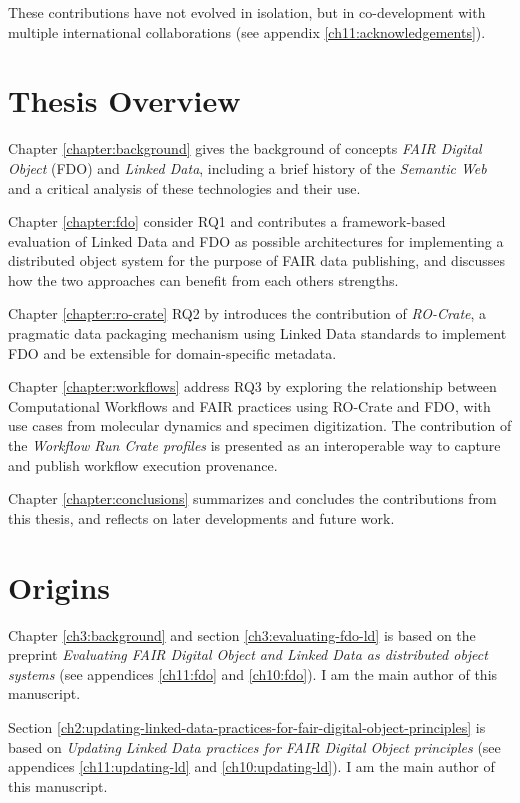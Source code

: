 These contributions have not evolved in isolation, but in co-development with multiple international collaborations (see appendix \vref{ch11:acknowledgements}).


\section{Thesis Overview}

Chapter \vref{chapter:background} gives the background of concepts \emph{FAIR Digital Object} (FDO) and \emph{Linked Data}, including a brief history of the \emph{Semantic Web} and a critical analysis of these technologies and their use. 

Chapter \vref{chapter:fdo} consider RQ1 and contributes a framework-based evaluation of Linked Data and FDO as possible architectures for implementing a distributed object system for the purpose of FAIR data publishing, and discusses how the two approaches can benefit from each others strengths. 

Chapter \vref{chapter:ro-crate} RQ2 by introduces the contribution of \emph{RO-Crate}, a pragmatic data packaging mechanism using Linked Data standards to implement FDO and be extensible for domain-specific metadata.  

Chapter \vref{chapter:workflows} address RQ3 by exploring the relationship between Computational Workflows and FAIR practices using RO-Crate and FDO, with use cases from molecular dynamics and specimen digitization. The contribution of the \emph{Workflow Run Crate profiles} is presented as an interoperable way to capture and publish workflow execution provenance. 

Chapter \vref{chapter:conclusions} summarizes and concludes the contributions from this thesis, and reflects on later developments and future work.


\section{Origins}

Chapter \ref{ch3:background} and section \ref{ch3:evaluating-fdo-ld} is based on the preprint \emph{Evaluating FAIR Digital Object and Linked Data as distributed object systems} \cite{soilandreyes2023c}  (see appendices \vref{ch11:fdo} and \vref{ch10:fdo}). I am the main author of this manuscript.

Section \ref{ch2:updating-linked-data-practices-for-fair-digital-object-principles} is based on \emph{Updating Linked Data practices for FAIR Digital Object principles} \cite{10.3897/rio.8.e94501} (see appendices \ref{ch11:updating-ld} and \ref{ch10:updating-ld}). I am the main author of this manuscript.

